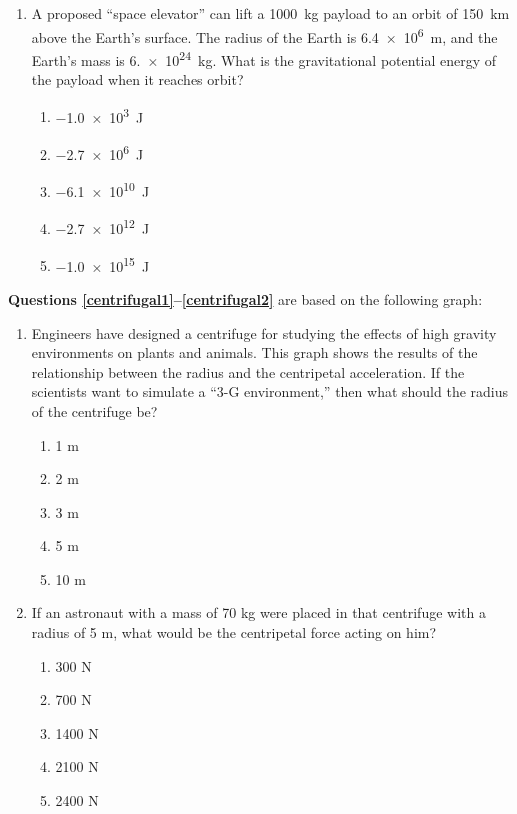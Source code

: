 \documentclass{../../../oss-classkick}
\begin{document}
\begin{multicols}{2}
\begin{enumerate}[leftmargin=18pt]
  \item A proposed ``space elevator'' can lift a \SI{1000}{\kilo\gram} payload
    to an orbit of \SI{150}{\kilo\metre} above the Earth's surface. The radius
    of the Earth is \SI{6.4e6}{\metre}, and the Earth's mass is
    \SI{6.e24}{\kilo\gram}. What is the gravitational potential energy of the
    payload when it reaches orbit?
    \begin{enumerate}[nosep,leftmargin=18pt,label=(\Alph*)]
    \item\SI{-1.0e3}{\joule}
    \item\SI{-2.7e6}{\joule}
    \item\SI{-6.1e10}{\joule}
    \item\SI{-2.7e12}{\joule}
    \item\SI{-1.0e15}{\joule}
    \end{enumerate}
  \end{enumerate}
  \columnbreak
  
  \textbf{Questions \ref{centrifugal1}--\ref{centrifugal2}} are based on the
  following graph:

  \begin{enumerate}[leftmargin=18pt,resume]
  \item Engineers have designed a centrifuge for studying the effects of high
    gravity environments on plants and animals. This graph shows the
    results of the relationship between the radius and the centripetal
    acceleration. If the scientists want to simulate a “3-G environment,”
    then what should the radius of the centrifuge be?
    \label{centrifugal1}
    \begin{enumerate}[nosep,leftmargin=18pt,label=(\Alph*)]
    \item 1 m
    \item 2 m
    \item 3 m
    \item 5 m
    \item 10 m
    \end{enumerate}
    
  \item If an astronaut with a mass of 70 kg were placed in that centrifuge with
    a radius of 5 m, what would be the centripetal force acting on him?
    \label{centrifugal2}
    \begin{enumerate}[nosep,leftmargin=18pt,label=(\Alph*)]
    \item 300 N
    \item 700 N
    \item 1400 N
    \item 2100 N
    \item 2400 N
    \end{enumerate}
    

\end{enumerate}
\end{multicols}
\end{document}
